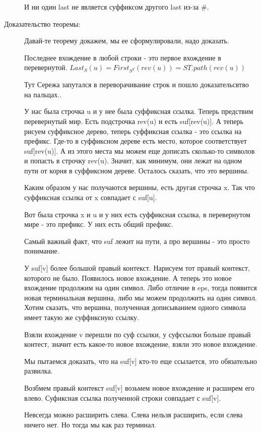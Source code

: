 \begin{description}
    И ни один last не является суффиксом другого last из-за \#.
     
    \item[Доказательство теоремы:]
    Давай-те теорему докажем, мы ее сформулировали, надо 
    доказать.

    \begin{lemma}
    Последнее вхождение в любой строки - это первое вхождение в 
    перевернутой.  
    $Last_{S}(u) = First_{S^T}(rev(u)) = ST.path(rev(u))$
    \end{lemma}

    Тут Сережа запутался в переворачивание строк и пошло 
    доказательсвтво на пальцах..

   
    У нас была строчка u и у нее была суффиксная ссылка. 
    Теперь предствим перевернутый мир. Есть 
    подстрочка rev(u) и есть suf[rev(u)]. А теперь
    рисуем суффиксное дерево, теперь
    суффиксная ссылка - это ссылка на префикс.
    Где-то в суффиксном дереве есть
    место, которое соответствует suf[rev(u)].
    А из этого места мы
    можем еще дописать сколько-то символов и попасть в
    строчку rev(u).  Значит,
    как минимум, они лежат на одном пути от корня в суффиксном дереве.
    Осталось сказать, что это вершины.

    Каким образом у нас получаются
    вершины, есть другая строчка x. Так что суффиксная
    ссылка от x совпадает с suf[u].

    Вот была строчка x и u и у них есть суффиксная ссылка, 
    в перевернутом мире - это префикс. У них есть 
    общий префикс.

    Самый важный факт, что suf лежит на пути, а про вершины - это
    просто понимание.  
    
    У suf[v] более большой правый контекст. Нарисуем тот правый контекст, 
    которого не было. 
    Появилось новое вхождение. А теперь это новое вхождение продолжим 
    на один символ. Либо отличие в eps, тогда появится новая
    терминальная вершина, либо мы можем продолжить
    на один символ. Хотим сказать, что 
    вершина, полученная дописыванием 
    одного символа имеет такую же суффиксную 
    ссылку. 

    Взяли вхождение v перешли по суф ссылки, 
    у суфссылки больше правый контест, значит 
    есть какое-то новое вхождение, взяли это новое вхождение. 

    Мы пытаемся доказать, что на suf[v] кто-то еще ссылается, 
    это обязательно развилка. 

    Возбмем правый контекст suf[v] возьмем новое вхождение 
    и расширем его влево. Суфиксная ссылка полученной строки 
    совпадает с suf[v].

    Невсегда можно расширить слева. Слева нельзя расширить, 
    если слева ничего нет. Но тогда мы как раз терминал. 
    \end{description}


